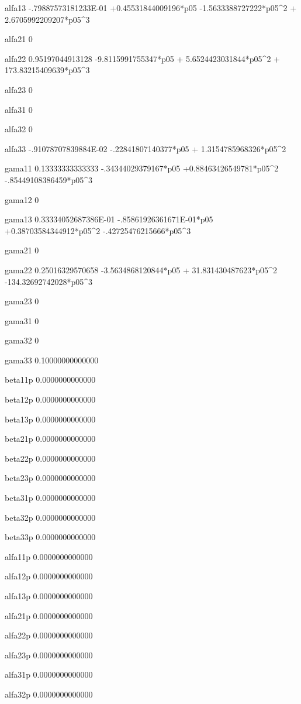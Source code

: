  alfa13 
  -.79887573181233E-01 +0.45531844009196*p05  -1.5633388727222*p05^2 + 2.6705992209207*p05^3 
  
 alfa21 
 0 
  
 alfa22 
  0.95197044913128  -9.8115991755347*p05 + 5.6524423031844*p05^2 + 173.83215409639*p05^3 
  
 alfa23 
 0 
  
 alfa31 
 0 
  
 alfa32 
 0 
  
 alfa33 
  -.91078707839884E-02  -.22841807140377*p05 + 1.3154785968326*p05^2 
  
 gama11 
  0.13333333333333  -.34344029379167*p05 +0.88463426549781*p05^2  -.85449108386459*p05^3 
  
 gama12 
 0 
  
 gama13 
  0.33334052687386E-01  -.85861926361671E-01*p05 +0.38703584344912*p05^2  -.42725476215666*p05^3 
  
 gama21 
 0 
  
 gama22 
  0.25016329570658  -3.5634868120844*p05 + 31.831430487623*p05^2  -134.32692742028*p05^3 
  
 gama23 
 0 
  
 gama31 
 0 
  
 gama32 
 0 
  
 gama33 
  0.10000000000000 
  
 beta11p
   0.0000000000000 
  
 beta12p
   0.0000000000000 
  
 beta13p
   0.0000000000000 
  
 beta21p
   0.0000000000000 
  
 beta22p
   0.0000000000000 
  
 beta23p
   0.0000000000000 
  
 beta31p
   0.0000000000000 
  
 beta32p
   0.0000000000000 
  
 beta33p
   0.0000000000000 
  
 alfa11p
   0.0000000000000 
  
 alfa12p
   0.0000000000000 
  
 alfa13p
   0.0000000000000 
  
 alfa21p
   0.0000000000000 
  
 alfa22p
   0.0000000000000 
  
 alfa23p
   0.0000000000000 
  
 alfa31p
   0.0000000000000 
  
 alfa32p
   0.0000000000000 
  
